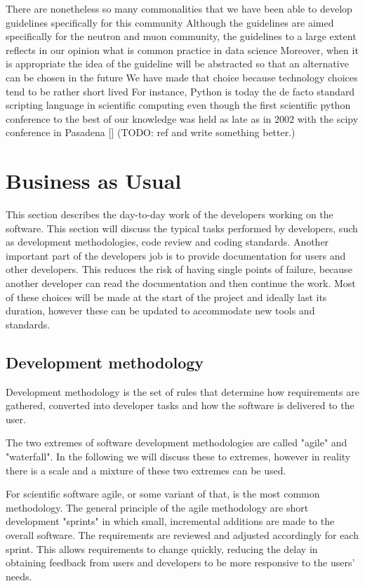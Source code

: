 \documentclass[jnr]{iosart2x}
\begin{document}
\begin{itemzie}
There are nonetheless so many commonalities that we have been able to develop guidelines specifically for this community
Although the guidelines are aimed specifically for the neutron and muon community, the guidelines to a large extent reflects in our opinion what is common practice in data science
Moreover, when it is appropriate the idea of the guideline will be abstracted so that an alternative can be chosen in the future
We have made that choice because technology choices tend to be rather short lived
For instance, Python is today the de facto standard scripting language in scientific computing even though the first scientific python conference to the best of our knowledge was held as late as in 2002 with the scipy conference in Pasadena [] (TODO: ref and write something better.)

\section{Business as Usual}
\label{Business as Usual}

This section describes the day-to-day work of the developers working on the software.
This section will discuss the typical tasks performed by developers, such as development methodologies, code review and coding standards.
Another important part of the developers job is to provide documentation for users and other developers.
This reduces the risk of having single points of failure, because another developer can read the documentation and then continue the work.
Most of these choices will be made at the start of the project and ideally last its duration, however these can be updated to accommodate new tools and standards.

\subsection{Development methodology}
\label{Development methodology}

Development methodology is the set of rules that determine how requirements are gathered, converted into developer tasks and how the software is delivered to the user.

The two extremes of software development methodologies are called "agile" and "waterfall".
In the following we will discuss these to extremes, however in reality there is a scale and a mixture of these two extremes can be used.

For scientific software agile, or some variant of that, is the most common methodology.
The general principle of the agile methodology are short development "sprints" in which small, incremental additions are made to the overall software.
The requirements are reviewed and adjusted accordingly for each sprint.
This allows requirements to change quickly, reducing the delay in obtaining feedback from users and developers to be more responsive to the users' needs.


\end{itemzie}
\end{document}
